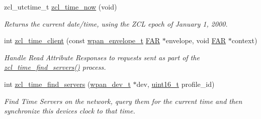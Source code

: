\begin{DoxyCompactItemize}
zcl\+\_\+utctime\+\_\+t \hyperlink{group__zcl__time_gad56f618c84b428540c5ffcb60095462c}{zcl\+\_\+time\+\_\+now} (void)
\begin{DoxyCompactList}\small\item\em Returns the current date/time, using the Z\+CL epoch of January 1, 2000. \end{DoxyCompactList}\item 
int \hyperlink{group__zcl__time_ga2c66ee215547beae5b5dde4f23cc8e00}{zcl\+\_\+time\+\_\+client} (const \hyperlink{structwpan__envelope__t}{wpan\+\_\+envelope\+\_\+t} \hyperlink{group__hal_gaef060b3456fdcc093a7210a762d5f2ed}{F\+AR} $\ast$envelope, void \hyperlink{group__hal_gaef060b3456fdcc093a7210a762d5f2ed}{F\+AR} $\ast$context)
\begin{DoxyCompactList}\small\item\em Handle Read Attribute Responses to requests sent as part of the \hyperlink{group__zcl__time_ga32a901048d0bf5b6c6cf9a1cf7fb1e28}{zcl\+\_\+time\+\_\+find\+\_\+servers()} process. \end{DoxyCompactList}\item 
int \hyperlink{group__zcl__time_ga32a901048d0bf5b6c6cf9a1cf7fb1e28}{zcl\+\_\+time\+\_\+find\+\_\+servers} (\hyperlink{structwpan__dev__t}{wpan\+\_\+dev\+\_\+t} $\ast$dev, \hyperlink{group__hal__dos_ga5a8b2dc9e45a9ee81a94ef304fb62505}{uint16\+\_\+t} profile\+\_\+id)
\begin{DoxyCompactList}\small\item\em Find Time Servers on the network, query them for the current time and then synchronize this device\textquotesingle{}s clock to that time. \end{DoxyCompactList}\end{DoxyCompactItemize}
